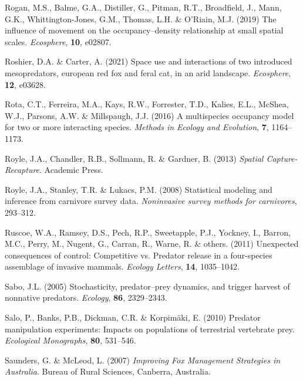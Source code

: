 \documentclass[11pt,a4paper,titlepage,twoside,openright]{style/unimelbthesis}
\begin{document}
\begin{mainmatter}
\leavevmode\hypertarget{ref-rogan2019influence}{}%
Rogan, M.S., Balme, G.A., Distiller, G., Pitman, R.T., Broadfield, J., Mann, G.K., Whittington-Jones, G.M., Thomas, L.H. \& O'Riain, M.J. (2019) The influence of movement on the occupancy--density relationship at small spatial scales. \emph{Ecosphere}, \textbf{10}, e02807.

\leavevmode\hypertarget{ref-roshier2021space}{}%
Roshier, D.A. \& Carter, A. (2021) Space use and interactions of two introduced mesopredators, european red fox and feral cat, in an arid landscape. \emph{Ecosphere}, \textbf{12}, e03628.

\leavevmode\hypertarget{ref-rota2016multispecies}{}%
Rota, C.T., Ferreira, M.A., Kays, R.W., Forrester, T.D., Kalies, E.L., McShea, W.J., Parsons, A.W. \& Millspaugh, J.J. (2016) A multispecies occupancy model for two or more interacting species. \emph{Methods in Ecology and Evolution}, \textbf{7}, 1164--1173.

\leavevmode\hypertarget{ref-royle2013spatial}{}%
Royle, J.A., Chandler, R.B., Sollmann, R. \& Gardner, B. (2013) \emph{Spatial Capture-Recapture}. Academic Press.

\leavevmode\hypertarget{ref-royle2008statistical}{}%
Royle, J.A., Stanley, T.R. \& Lukacs, P.M. (2008) Statistical modeling and inference from carnivore survey data. \emph{Noninvasive survey methods for carnivores}, 293--312.

\leavevmode\hypertarget{ref-ruscoe2011unexpected}{}%
Ruscoe, W.A., Ramsey, D.S., Pech, R.P., Sweetapple, P.J., Yockney, I., Barron, M.C., Perry, M., Nugent, G., Carran, R., Warne, R. \& others. (2011) Unexpected consequences of control: Competitive vs. Predator release in a four-species assemblage of invasive mammals. \emph{Ecology Letters}, \textbf{14}, 1035--1042.

\leavevmode\hypertarget{ref-sabo2005stochasticity}{}%
Sabo, J.L. (2005) Stochasticity, predator--prey dynamics, and trigger harvest of nonnative predators. \emph{Ecology}, \textbf{86}, 2329--2343.

\leavevmode\hypertarget{ref-salo2010predator}{}%
Salo, P., Banks, P.B., Dickman, C.R. \& Korpimäki, E. (2010) Predator manipulation experiments: Impacts on populations of terrestrial vertebrate prey. \emph{Ecological Monographs}, \textbf{80}, 531--546.

\leavevmode\hypertarget{ref-saunders2007improving}{}%
Saunders, G. \& McLeod, L. (2007) \emph{Improving Fox Management Strategies in Australia}. Bureau of Rural Sciences, Canberra, Australia.


\end{mainmatter}
\end{document}
